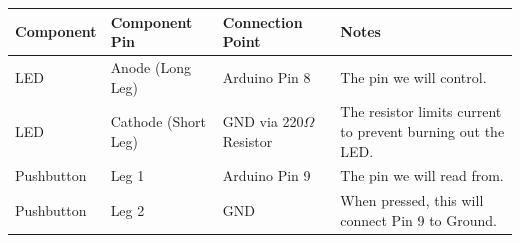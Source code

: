 \documentclass[11pt,a4paper]{article}
\begin{document}
\begin{table}[h]
\centering
\begin{tabular}{lllp{5.5cm}}
\toprule
\textbf{Component} & \textbf{Component Pin} & \textbf{Connection Point} & \textbf{Notes} \\
\midrule
LED & Anode (Long Leg) & Arduino Pin 8 & The pin we will control. \\
LED & Cathode (Short Leg) & GND via 220$\Omega$ Resistor & The resistor limits current to prevent burning out the LED. \\
Pushbutton & Leg 1 & Arduino Pin 9 & The pin we will read from. \\
Pushbutton & Leg 2 & GND & When pressed, this will connect Pin 9 to Ground. \\
\bottomrule
\end{tabular}
\end{table}
\end{document}
